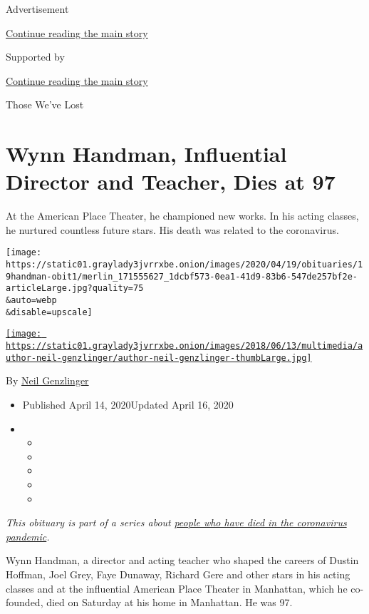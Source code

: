 Advertisement

\protect\hyperlink{after-top}{Continue reading the main story}

Supported by

\protect\hyperlink{after-sponsor}{Continue reading the main story}

Those We've Lost

\hypertarget{wynn-handman-influential-director-and-teacher-dies-at-97}{%
\section{Wynn Handman, Influential Director and Teacher, Dies at
97}\label{wynn-handman-influential-director-and-teacher-dies-at-97}}

At the American Place Theater, he championed new works. In his acting
classes, he nurtured countless future stars. His death was related to
the coronavirus.

\texttt{[image: https://static01.graylady3jvrrxbe.onion/images/2020/04/19/obituaries/19handman-obit1/merlin\_171555627\_1dcbf573-0ea1-41d9-83b6-547de257bf2e-articleLarge.jpg?quality=75\\\&auto=webp\\\&disable=upscale]}

\href{https://www.nytimes3xbfgragh.onion/by/neil-genzlinger}{\texttt{[image: https://static01.graylady3jvrrxbe.onion/images/2018/06/13/multimedia/author-neil-genzlinger/author-neil-genzlinger-thumbLarge.jpg]}}

By \href{https://www.nytimes3xbfgragh.onion/by/neil-genzlinger}{Neil
Genzlinger}

\begin{itemize}
\item
  Published April 14, 2020Updated April 16, 2020
\item
  \begin{itemize}
  \item
  \item
  \item
  \item
  \item
  \end{itemize}
\end{itemize}

\emph{This obituary is part of a series about}
\href{https://www.nytimes3xbfgragh.onion/series/people-who-have-died-of-the-coronavirus}{\emph{people
who have died in the coronavirus pandemic}}\emph{.}

Wynn Handman, a director and acting teacher who shaped the careers of
Dustin Hoffman, Joel Grey, Faye Dunaway, Richard Gere and other stars in
his acting classes and at the influential American Place Theater in
Manhattan, which he co-founded, died on Saturday at his home in
Manhattan. He was 97.

